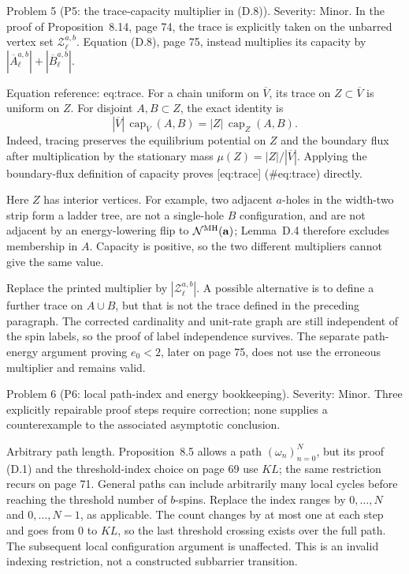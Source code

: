 \documentclass[10pt]{article}
\begin{document}
Problem 5 (P5: the trace-capacity multiplier in (D.8)).  Severity: Minor. In the proof of Proposition 8.14, page 74, the trace is explicitly taken on the unbarred vertex set \(\mathcal Z_\ell^{a,b}\). Equation (D.8), page 75, instead multiplies its capacity by \(|\overline A_\ell^{a,b}|+|\overline B_\ell^{a,b}|\).\par
Equation reference: eq:trace. For a chain uniform on \(\overline V\), its trace on \(Z\subset\overline V\) is uniform on \(Z\). For disjoint \(A,B\subset Z\), the exact identity is \[
 |\overline V|\,\operatorname{cap}_{\overline V}(A,B)
       =|Z|\,\operatorname{cap}_{Z}(A,B).\] Indeed, tracing preserves the equilibrium potential on \(Z\) and the boundary flux after multiplication by the stationary mass \(\mu(Z)=|Z|/|\overline V|\). Applying the boundary-flux definition of capacity proves [eq:trace] (\#eq:trace) directly.\par
Here \(Z\) has interior vertices. For example, two adjacent \(a\)-holes in the width-two strip form a ladder tree, are not a single-hole \(B\) configuration, and are not adjacent by an energy-lowering flip to \(\mathcal N^{\rm MH}(\mathbf a)\); Lemma D.4 therefore excludes membership in \(A\). Capacity is positive, so the two different multipliers cannot give the same value.\par
Replace the printed multiplier by \(|\mathcal Z_\ell^{a,b}|\). A possible alternative is to define a further trace on \(A\cup B\), but that is not the trace defined in the preceding paragraph. The corrected cardinality and unit-rate graph are still independent of the spin labels, so the proof of label independence survives. The separate path-energy argument proving \(e_0<2\), later on page 75, does not use the erroneous multiplier and remains valid.\par
Problem 6 (P6: local path-index and energy bookkeeping).  Severity: Minor. Three explicitly repairable proof steps require correction; none supplies a counterexample to the associated asymptotic conclusion.\par
Arbitrary path length. Proposition 8.5 allows a path \((\omega_n)_{n=0}^N\), but its proof (D.1) and the threshold-index choice on page 69 use \(KL\); the same restriction recurs on page 71. General paths can include arbitrarily many local cycles before reaching the threshold number of \(b\)-spins. Replace the index ranges by \(0,\ldots,N\) and \(0,\ldots,N-1\), as applicable. The count changes by at most one at each step and goes from 0 to \(KL\), so the last threshold crossing exists over the full path. The subsequent local configuration argument is unaffected. This is an invalid indexing restriction, not a constructed subbarrier transition.\par
\end{document}
